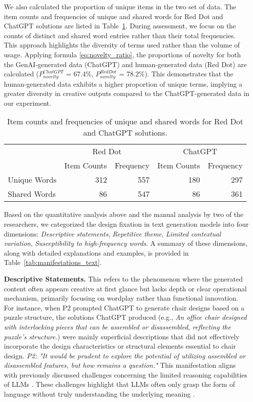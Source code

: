 We also calculated the proportion of unique items in the two set of data. The item counts and frequencies of unique and shared words for Red Dot and ChatGPT solutions are listed in Table~\ref{tab:word_frequencies}. During assessment, we focus on the counts of distinct and shared word entries rather than their total frequencies. This approach highlights the diversity of terms used rather than the volume of usage. Applying formula \ref{eq:novelty_ratio}, the proportions of novelty for both the GenAI-generated data (ChatGPT) and human-generated data (Red Dot) are calculated ($P_{novelty}^{ChatGPT}$ = 67.4\%, $P_{novelty}^{Red Dot}$ = 78.2\%). This demonstrates that the human-generated data exhibits a higher proportion of unique terms, implying a greater diversity in creative outputs compared to the ChatGPT-generated data in our experiment. 

\begin{table}[ht]
\centering
\caption{Item counts and frequencies of unique and shared words for Red Dot and ChatGPT solutions.}
\label{tab:word_frequencies}
\begin{tabular}{lrrrr}
\hline
& \multicolumn{2}{c}{Red Dot} & \multicolumn{2}{c}{ChatGPT} \\
\cline{2-5}
& Item Counts & Frequency & Item Counts & Frequency \\
\hline
Unique Words & 312 & 557 & 180 & 297 \\
Shared Words & 86 & 547 & 86 & 361 \\
\hline
\end{tabular}
\end{table}

Based on the quantitative analysis above and the manual analysis by two of the researchers, we categorized the design fixation in text generation models into four dimensions: \textit{Descriptive statements}, \textit{Repetitive theme}, \textit{Limited contextual variation}, \textit{Susceptibility to high-frequency words}. A summary of these dimensions, along with detailed explanations and examples, is provided in Table~\ref{tab:manifestations_text}.

\textbf{Descriptive Statements.} This refers to the phenomenon where the generated content often appears creative at first glance but lacks depth or clear operational mechanism, primarily focusing on wordplay rather than functional innovation. For instance, when P2 prompted ChatGPT to generate chair designs based on a puzzle structure, the solutions ChatGPT produced (e.g., \textit{An office chair designed with interlocking pieces that can be assembled or disassembled, reflecting the puzzle's structure.}) were mainly superficial descriptions that did not effectively incorporate the design characteristics or structural elements essential to chair design. \textit{P2: "It would be prudent to explore the potential of utilizing assembled or disassembled features, but how remains a question."} This manifestation aligns with previously discussed challenges concerning the limited reasoning capabilities of LLMs \cite{wu2022ai}. These challenges highlight that LLMs often only grasp the form of language without truly understanding the underlying meaning \cite{bender2020climbing}.

